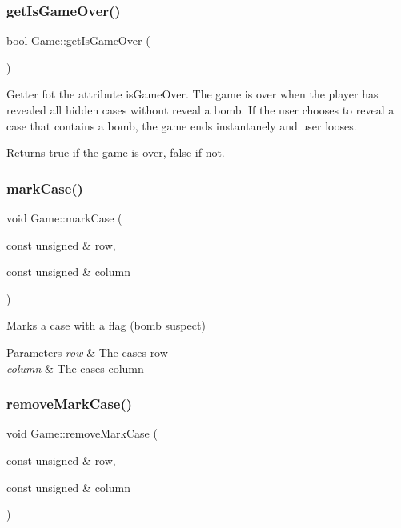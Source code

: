 \subsubsection{\texorpdfstring{get\+Is\+Game\+Over()}{getIsGameOver()}}
{\footnotesize\ttfamily bool Game\+::get\+Is\+Game\+Over (\begin{DoxyParamCaption}{ }\end{DoxyParamCaption})\hspace{0.3cm}{\ttfamily [inline]}}



Getter fot the attribute \textquotesingle{}is\+Game\+Over\textquotesingle{}. The game is over when the player has revealed all hidden cases without reveal a bomb. If the user chooses to reveal a case that contains a bomb, the game ends instantanely and user looses. 

\begin{DoxyReturn}{Returns}
true if the game is over, false if not. 
\end{DoxyReturn}
\mbox{\label{class_game_ab83061fabcbe5b952235162cc5f55df0}} 
\subsubsection{\texorpdfstring{mark\+Case()}{markCase()}}
{\footnotesize\ttfamily void Game\+::mark\+Case (\begin{DoxyParamCaption}\item[{const unsigned \&}]{row,  }\item[{const unsigned \&}]{column }\end{DoxyParamCaption})}



Marks a case with a flag (bomb suspect) 


\begin{DoxyParams}{Parameters}
{\em row} & The case\textquotesingle{}s row \\
\hline
{\em column} & The case\textquotesingle{}s column \\
\hline
\end{DoxyParams}
\mbox{\label{class_game_adccaa192130e7d6f5c5973b136c0e1c7}} 
\subsubsection{\texorpdfstring{remove\+Mark\+Case()}{removeMarkCase()}}
{\footnotesize\ttfamily void Game\+::remove\+Mark\+Case (\begin{DoxyParamCaption}\item[{const unsigned \&}]{row,  }\item[{const unsigned \&}]{column }\end{DoxyParamCaption})}



